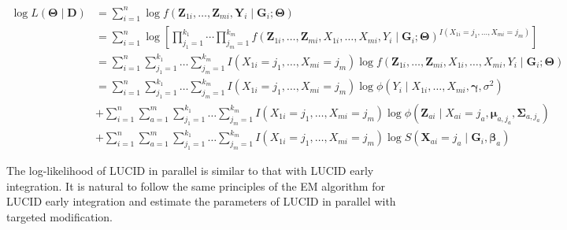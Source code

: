 \[\begin{aligned}
\log L(\boldsymbol{\mathbf{\Theta}}\mid \boldsymbol{D}) &  =\sum_{i=1}^{n} \log f\left(\boldsymbol{Z}_{1 i}, \ldots, \boldsymbol{Z}_{m i}, \boldsymbol{Y}_{i} \mid \boldsymbol{G}_{i} ; \boldsymbol{\Theta}\right) \\
& =\sum_{i=1}^{n} \log \left[\prod_{j_{1}=1}^{k_{1}} \cdots \prod_{j_{m}=1}^{k_{m}} f\left(\boldsymbol{Z}_{1 i}, \ldots, \boldsymbol{Z}_{m i}, X_{1 i}, \ldots, X_{m i}, Y_{i} \mid \boldsymbol{G}_{i} ; \boldsymbol{\Theta}\right)^{I\left(X_{1 i}=j_{1}, \ldots, X_{m i}=j_{m}\right)}\right] \\
& =\sum_{i=1}^{n} \sum_{j_{1}=1}^{k_{1}} \ldots \sum_{j_{m}=1}^{k_{m}} I\left(X_{1 i}=j_{1}, \ldots, X_{m i}=j_{m}\right) \log f\left(\boldsymbol{Z}_{1 i}, \ldots, \boldsymbol{Z}_{m i}, X_{1 i}, \ldots, X_{m i}, Y_{i} \mid \boldsymbol{G}_{i} ; \boldsymbol{\Theta}\right) \\
& =\sum_{i=1}^{n} \sum_{j_{1}=1}^{k_{1}} \ldots \sum_{j_{m}=1}^{k_{m}} I\left(X_{1 i}=j_{1}, \ldots, X_{m i}=j_{m}\right) \log \phi\left(Y_{i} \mid X_{1 i}, \ldots, X_{m i}, \boldsymbol{\gamma}, \sigma^{2}\right) \\
& +\sum_{i=1}^{n} \sum_{a=1}^{m} \sum_{j_{1}=1}^{k_{1}} \ldots \sum_{j_{m}=1}^{k_{m}} I\left(X_{1 i}=j_{1}, \ldots, X_{m i}=j_{m}\right) \log \phi\left(\boldsymbol{Z}_{a i} \mid X_{a i}=j_{a}, \boldsymbol{\mu}_{a, j_{a}}, \boldsymbol{\Sigma}_{a, j_{a}}\right) \\
& +\sum_{i=1}^{n} \sum_{a=1}^{m} \sum_{j_{1}=1}^{k_{1}} \ldots \sum_{j_{m}=1}^{k_{m}} I\left(X_{1 i}=j_{1}, \ldots, X_{m i}=j_{m}\right) \log S\left(\boldsymbol{X}_{a i}=j_{a} \mid \boldsymbol{G}_{i}, \boldsymbol{\beta}_{a}\right)
\end{aligned}
    \label{eq_26}   \label{eq:eq-26}\]

The log-likelihood of LUCID in parallel is similar to that with LUCID
early integration. It is natural to follow the same principles of the EM
algorithm for LUCID early integration and estimate the parameters of
LUCID in parallel with targeted modification.


